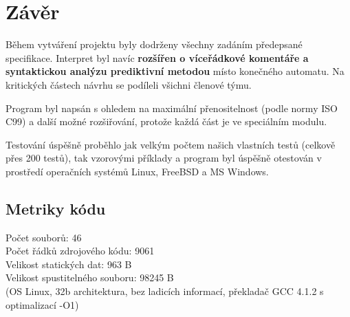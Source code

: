 \section{Závěr}

Během vytváření projektu byly dodrženy všechny zadáním předepsané specifikace. Interpret byl navíc \textbf{rozšířen o víceřádkové komentáře a syntaktickou analýzu prediktivní metodou} místo konečného automatu. Na kritických částech návrhu se podíleli všichni členové týmu.

Program byl napsán s ohledem na maximální přenositelnost (podle normy ISO C99) a další možné rozšiřování, protože každá část je ve speciálním modulu.

Testování úspěšně proběhlo jak velkým počtem našich vlastních testů (celkově přes 200 testů), tak vzorovými příklady a program byl úspěšně otestován v prostředí operačních systémů Linux, FreeBSD a MS Windows.

\subsection{Metriky kódu}

Počet souborů: 46 \\
Počet řádků zdrojového kódu: 9061 \\
Velikost statických dat: 963 B \\
Velikost spustitelného souboru: 98245 B \\
(OS Linux, 32b architektura, bez ladicích informací, překladač GCC 4.1.2 s optimalizací -O1) \\
